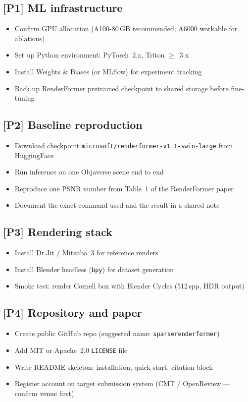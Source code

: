 \documentclass[11pt,a4paper]{article}
\newcommand{\role}[1]{\textbf{[#1]}}
\newcommand{\sq}{\item[$\square$]}
\begin{document}
\subsection{\role{P1} ML infrastructure}
\begin{itemize}[leftmargin=1.8em, itemsep=2pt]
  \sq Confirm GPU allocation (A100-80\,GB recommended; A6000 workable for ablations)
  \sq Set up Python environment: PyTorch~2.x, Triton $\geq$~3.x
  \sq Install Weights \& Biases (or MLflow) for experiment tracking
  \sq Back up RenderFormer pretrained checkpoint to shared storage before fine-tuning
\end{itemize}

\subsection{\role{P2} Baseline reproduction}
\begin{itemize}[leftmargin=1.8em, itemsep=2pt]
  \sq Download checkpoint \texttt{microsoft/renderformer-v1.1-swin-large} from HuggingFace
  \sq Run inference on one Objaverse scene end to end
  \sq Reproduce one PSNR number from Table~1 of the RenderFormer paper
  \sq Document the exact command used and the result in a shared note
\end{itemize}

\subsection{\role{P3} Rendering stack}
\begin{itemize}[leftmargin=1.8em, itemsep=2pt]
  \sq Install Dr.Jit / Mitsuba~3 for reference renders
  \sq Install Blender headless (\texttt{bpy}) for dataset generation
  \sq Smoke test: render Cornell box with Blender Cycles (512\,spp, HDR output)
\end{itemize}

\subsection{\role{P4} Repository and paper}
\begin{itemize}[leftmargin=1.8em, itemsep=2pt]
  \sq Create public GitHub repo (suggested name: \texttt{sparserenderformer})
  \sq Add MIT or Apache~2.0 \texttt{LICENSE} file
  \sq Write README skeleton: installation, quick-start, citation block
  \sq Register account on target submission system (CMT / OpenReview --- confirm venue first)
\end{itemize}
\end{document}
